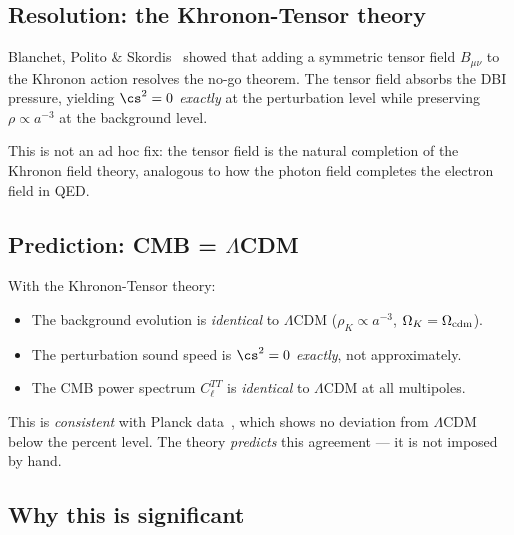 \subsection{Resolution: the Khronon-Tensor theory}
\label{sec:khronon_tensor}

Blanchet, Polito \& Skordis~\cite{BS2025} showed that adding a
symmetric tensor field $B_{\mu\nu}$ to the Khronon action resolves
the no-go theorem.  The tensor field absorbs the DBI pressure,
yielding $\cs^2 = 0$ \emph{exactly} at the perturbation level
while preserving $\rho \propto a^{-3}$ at the background level.

This is not an ad hoc fix: the tensor field is the natural completion
of the Khronon field theory, analogous to how the photon field
completes the electron field in QED.


\subsection{Prediction: CMB = \texorpdfstring{$\Lambda$CDM}{LCDM}}
\label{sec:cmb_prediction}

With the Khronon-Tensor theory:
\begin{itemize}
\item The background evolution is \emph{identical} to $\Lambda$CDM
  ($\rho_K \propto a^{-3}$, $\Omega_K = \Omega_{\rm cdm}$).
\item The perturbation sound speed is $\cs^2 = 0$ \emph{exactly},
  not approximately.
\item The CMB power spectrum $C_\ell^{TT}$ is \emph{identical}
  to $\Lambda$CDM at all multipoles.
\end{itemize}

This is \emph{consistent} with Planck data~\cite{Planck2018}, which
shows no deviation from $\Lambda$CDM below the percent level.  The
theory \emph{predicts} this agreement --- it is not imposed by hand.


\subsection{Why this is significant}
\label{sec:cmb_significance}


